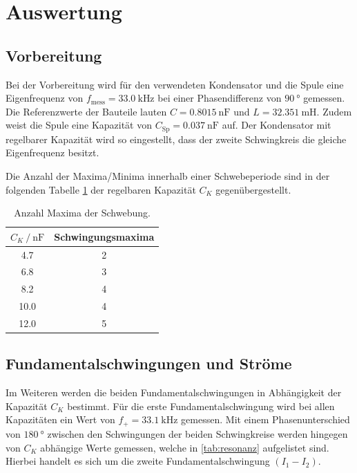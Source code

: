 \section{Auswertung}
\label{sec:Auswertung}

\subsection{Vorbereitung}
Bei der Vorbereitung wird für den verwendeten Kondensator und die Spule eine Eigenfrequenz von 
$f_{\text{mess}}=\SI{33.0}{\kilo\hertz}$ bei einer Phasendifferenz von $\SI{90}{\degree}$ gemessen. 
Die Referenzwerte der Bauteile lauten $C=\SI{0.8015}{\nano\farad}$ und $L=\SI{32.351}{\milli\henry}$. 
Zudem weist die Spule eine Kapazität von $C_\text{Sp}=\SI{0.037}{\nano\farad}$ auf.
Der Kondensator mit regelbarer Kapazität wird so eingestellt, dass der zweite Schwingkreis die gleiche Eigenfrequenz besitzt.

Die Anzahl der Maxima/Minima innerhalb einer Schwebeperiode sind in der folgenden Tabelle \ref{tab:schwing_maxima} der regelbaren Kapazität $C_K$ gegenübergestellt.

\begin{table}
    \centering
    \caption{Anzahl Maxima der Schwebung.}
    \label{tab:schwing_maxima}
    \begin{tabular}{c c}
        \toprule
        {$C_K \:/\: \si{\nano\farad}$} & Schwingungsmaxima \\
        \midrule
        4.7  & 2 \\ 
        6.8  & 3 \\ 
        8.2  & 4 \\ 
        10.0 & 4 \\ 
        12.0 & 5 \\ 
        \bottomrule
    \end{tabular}
\end{table}

\subsection{Fundamentalschwingungen und Ströme}
Im Weiteren werden die beiden Fundamentalschwingungen in Abhängigkeit der Kapazität $C_K$ bestimmt.
Für die erste Fundamentalschwingung wird bei allen Kapazitäten ein Wert von $f_+ = \SI{33.1}{\kilo\hertz}$ gemessen.
Mit einem Phasenunterschied von $\SI{180}{\degree}$ zwischen den Schwingungen der beiden Schwingkreise werden %
hingegen %
von $C_K$ abhängige Werte gemessen, welche in \ref{tab:resonanz} aufgelistet sind.
Hierbei handelt es sich um die zweite Fundamentalschwingung ${(I_1 - I_2)}$.

